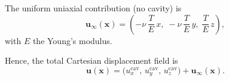 \documentclass[sn-mathphys,Numbered]{sn-jnl}%
\begin{document}
\begin{appendices}
The uniform uniaxial contribution (no cavity) is
\begin{equation}
\mathbf u_{\infty}(\mathbf x)
= \left(-\nu\,\frac{T}{E}\,x,\; -\nu\,\frac{T}{E}\,y,\; \frac{T}{E}\,z\right),
\end{equation}
with \(E\) the Young’s modulus.

Hence, the total Cartesian displacement field is
\begin{equation}
\mathbf u(\mathbf x)
= \big(u_x^{\text{cav}},\,u_y^{\text{cav}},\,u_z^{\text{cav}}\big)
  + \mathbf u_{\infty}(\mathbf x).
\end{equation}


\end{appendices}


\end{document}
